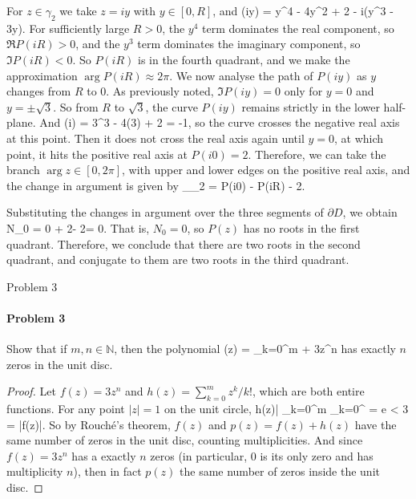 \documentclass[12pt]{article}
\newenvironment{fullbox}{\begin{lrbox}{\savefullbox}\begin{minipage}{\dimexpr\textwidth-2\fboxsep\relax}}{\end{minipage}\end{lrbox}\begin{center}\framebox[\textwidth]{\usebox{\savefullbox}}\end{center}}
\newenvironment{pbox}[1][]{\begin{fullbox}\ifx#1\empty\else\paragraph{#1}\fi}{\end{fullbox}}
\theoremstyle{definition}
\newcommand{\N}{\mathbb{N}}
\newcommand{\bd}{\partial}
\def\[#1\]{\begin{align*}#1\end{align*}}
\begin{document}
For $z \in \gamma_2$ we take $z = iy$ with $y \in [0, R]$, and
\[
    P(iy) = y^4 - 4y^2 + 2 - i(y^3 - 3y).
\]
For sufficiently large $R > 0$, the $y^4$ term dominates the real component, so $\Re P(iR) > 0$, and the $y^3$ term dominates the imaginary component, so $\Im P(iR) < 0$. So $P(iR)$ is in the fourth quadrant, and we make the approximation $\arg P(iR) \approx 2\pi$. We now analyse the path of $P(iy)$ as $y$ changes from $R$ to $0$. As previously noted, $\Im P(iy) = 0$ only for $y = 0$ and $y = \pm\sqrt{3}$.  So from $R$ to $\sqrt{3}$, the curve $P(iy)$ remains strictly in the lower half-plane. And
\[
    P(i) = 3^3 - 4(3) + 2 = -1,
\]
so the curve crosses the negative real axis at this point. Then it does not cross the real axis again until $y=0$, at which point, it hits the positive real axis at $P(i0) = 2$. Therefore, we can take the branch $\arg z \in [0, 2\pi]$, with upper and lower edges on the positive real axis, and the change in argument is given by
\[
    \int_{\gamma_2} 
        = \arg P(i0) - \arg P(iR)
         - 2\pi.
\]

Substituting the changes in argument over the three segments of $\bd D$, we obtain
\[
    2\pi N_0 = 0 + 2\pi - 2\pi = 0.
\]
That is, $N_0 = 0$, so $P(z)$ has no roots in the first quadrant. Therefore, we conclude that there are two roots in the second quadrant, and conjugate to them are two roots in the third quadrant.







\newpage
\begin{pbox}[Problem 3]
    Show that if $m, n \in \N$, then the polynomial
    \[
        p(z) = \sum_{k=0}^{m}  + 3z^n
    \]
    has exactly $n$ zeros in the unit disc.
\end{pbox}

\begin{proof}
    Let $f(z) = 3z^n$ and $h(z) = \sum_{k=0}^{m} z^k/k!$, which are both entire functions. For any point $|z| = 1$ on the unit circle,
    \[
        |h(z)|
            \leq \sum_{k=0}^{m}  
            \leq \sum_{k=0}^{\infty} 
            = e
            < 3
            = |f(z)|.
    \]
    So by Rouch\'e's theorem, $f(z)$ and $p(z) = f(z) + h(z)$ have the same number of zeros in the unit disc, counting multiplicities. And since $f(z) = 3z^n$ has a exactly $n$ zeros (in particular, $0$ is its only zero and has multiplicity $n$), then in fact $p(z)$ the same number of zeros inside the unit disc.
    
\end{proof}
\end{document}
